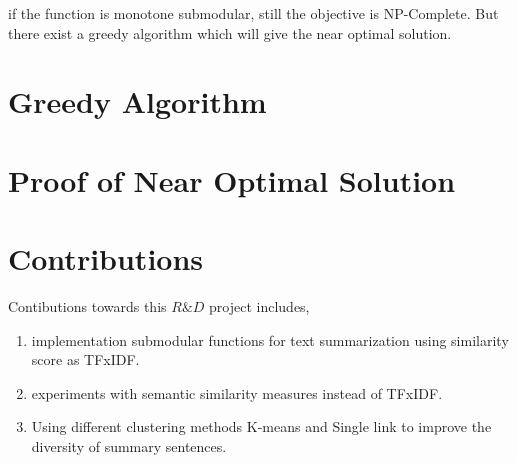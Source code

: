 
if the function is monotone submodular, still the objective is NP-Complete. But there exist a greedy algorithm which will give the near optimal solution.

\section{Greedy Algorithm}


\section{Proof of Near Optimal Solution}


\section{Contributions}

Contibutions towards this $R\&D$ project includes, 

\begin{enumerate}
\item {implementation submodular functions for text summarization using similarity score as TFxIDF.}
\item {experiments with semantic similarity measures instead of TFxIDF.}
\item {Using different clustering methods K-means and Single link to improve the diversity of summary sentences.}
\end{enumerate}



